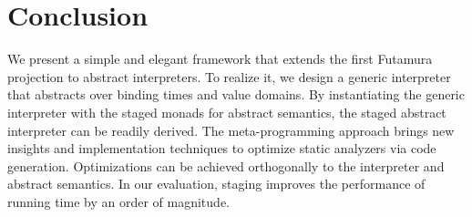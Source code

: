 \section{Conclusion}

We present a simple and elegant framework that extends the first Futamura
projection to abstract interpreters.
To realize it, we design a generic interpreter that abstracts over binding
times and value domains. By instantiating the generic interpreter with the
staged monads for abstract semantics, the staged abstract interpreter can be
readily derived.  The meta-programming approach brings new insights and
implementation techniques to optimize static analyzers via code generation.
Optimizations can be achieved orthogonally to the interpreter and abstract
semantics.  In our evaluation, staging improves the performance of running time
by an order of magnitude.

